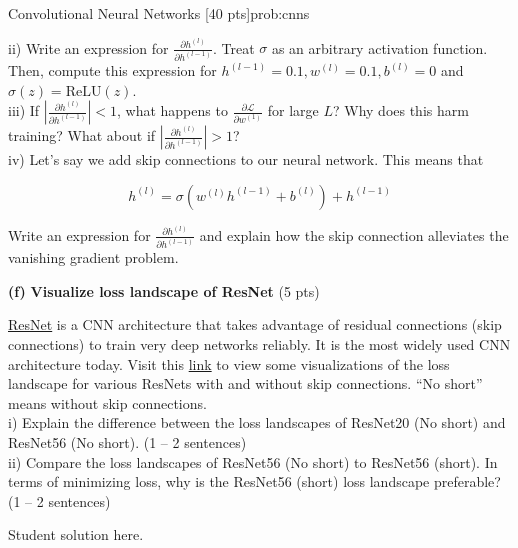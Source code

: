 \begin{problem}{Convolutional Neural Networks \hfill [40 pts]}{prob:cnns}
\begin{adjustwidth}{2em}{2em}
\begin{adjustwidth}{2em}{2em}
    ii) Write an expression for $\frac{\partial h^{(l)}}{ \partial h^{(l-1)}}$. Treat $\sigma$ as an arbitrary activation function. Then, compute this expression for $h^{(l - 1)} = 0.1, w^{(l)} = 0.1, b^{(l)} = 0$ and $\sigma(z) = \text{ReLU}(z)$. \\

    iii) If $\left|\frac{\partial h^{(l)}}{ \partial h^{(l-1)}}\right| < 1$, what happens to $\frac{\partial \mathcal{L}}{ \partial w^{(1)}}$ for large $L$? Why does this harm training? What about if $\left|\frac{\partial h^{(l)}}{ \partial h^{(l-1)}}\right| > 1$? \\
    
    iv) Let's say we add skip connections to our neural network. This means that
    
    $$h^{(l)} = \sigma(w^{(l)}h^{(l - 1)} + b^{(l)}) + h^{(l - 1)}$$
    
    Write an expression for $\frac{\partial h^{(l)}}{ \partial h^{(l-1)}}$ and explain how the skip connection alleviates the vanishing gradient problem. \\
    
    \end{adjustwidth}

    
    
    \textbf{(f)} \textbf{Visualize loss landscape of ResNet} \hfill (5 pts)
    \begin{adjustwidth}{2em}{2em}
        \href{https://arxiv.org/abs/1512.03385}{ResNet} is a CNN architecture that takes advantage of residual connections (skip connections) to train very deep networks reliably. It is the most widely used CNN architecture today. Visit this \href{http://www.telesens.co/loss-landscape-viz/viewer.html}{link} to view some visualizations of the loss landscape for various ResNets with and without skip connections. ``No short'' means without skip connections. \\
        

        i) Explain the difference between the loss landscapes of ResNet20 (No short) and ResNet56 (No short). (1 -- 2 sentences) \\

        ii) Compare the loss landscapes of ResNet56 (No short) to ResNet56 (short). In terms of minimizing loss, why is the ResNet56 (short) loss landscape preferable? (1 -- 2 sentences)
        
    \end{adjustwidth}
\end{adjustwidth}

\end{problem}

\begin{solution*}{}{}
Student solution here.
\end{solution*}